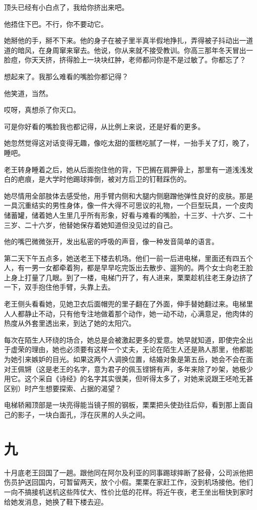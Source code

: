 \documentclass[lang=cn,newtx,12pt,scheme=chinese]{elegantbook}
\begin{document}
顶头已经有小白点了，我给你挤出来吧。

他捂住下巴。不行，你不要动它。

她掰他的手，掰不下来。他的身子在被子里半真半假地挣扎，弄得被子抖动出一道道的暗风，在身周窜来窜去。他说，你从来就不接受教训。你高三那年冬天冒出一脸痘，你天天挤，挤得脸上一块块红肿，老师都问你是不是过敏了。你都忘了？

想起来了。我那么难看的嘴脸你都记得？

他笑道，当然。

哎呀，真想杀了你灭口。

可是你好看的嘴脸我也都记得，从比例上来说，还是好看的更多。

她忽然觉得这对话变得无趣，像吃太甜的蛋糕吃腻了一样，一抬手关了灯，晚了，睡吧。

老王转身睡着之后，她从后面抱住他的背，下巴搁在肩胛骨上，那里有一道浅浅发白的疤痕，是大学时他踢球摔倒，被对方后卫的钉鞋踩伤的。

她尽情用全部肢体去感受他，用手臂内侧和大腿内侧磨蹭他弹性良好的皮肤。那是一具沉重结实的男性身体，像一件大得不可思议的礼物，一个巨型玩具，一个皮肉储蓄罐，储着她人生里几乎所有形象，好看与难看的嘴脸，十三岁、十六岁、二十三岁、二十六岁，他替她保存着她知道但没见过的自己。

他的嘴巴微微张开，发出私密的呼吸的声音，像一种发音简单的语言。

第二天下午五点多，她送老王下楼去机场。他们一前一后进电梯，里面还有四五个人，有一男一女都牵着狗，都是早早吃完饭出去散步、遛狗的。两个女士向老王脸上身上打量了几眼。到了一楼，电梯门开了，有人进来，栗栗趁机往老王身边挤了一下，双手抱住他手臂，头靠上去。

老王侧头看看她，见她卫衣后面帽兜的里子翻在了外面，伸手替她翻过来。电梯里人人都静止不动，只有他专注地做着那个动作，她一动不动，心满意足，他肉体的热度从外套里透出来，到达了她的太阳穴。

每次在陌生人环绕的场合，她总是会被激起更多的爱意。她早就知道，即使完全出于虚荣的理由，她也必须要有这样一个丈夫，无论在陌生人还是熟人那里，他都能为她引来嫉妒的目光。如果这两个人调换位置，结婚对象是第五岳，她会不会在面对王佩锵（这是老王的名字，意为君子的佩玉铿锵有声，多年来除了吵架，她极少用它。这个采自《诗经》的名字其实很美，但听得太多了，对她来说跟王呸呛无甚区别）时产生想要探索、占据的渴望？

电梯轿厢顶部是一块亮得能当镜子照的钢板，栗栗把头使劲往后仰，看到那上面自己的影子，一块白面孔，浮在灰黑的人头之间。
\section{九}
十月底老王回国了一趟。跟他同在阿尔及利亚的同事踢球摔断了胫骨，公司派他把伤员护送回国内，可暂留两天，放个小假。栗栗在家赶工作，没到机场接他。他们一向不搞接机送机这些阵仗大、性价比低的花样。将近午夜，老王坐出租快到家时给她发消息，她换了鞋下楼去迎。
\end{document}
